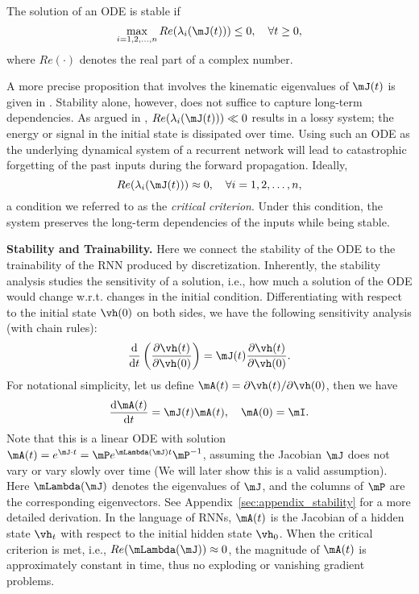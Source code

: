 \begin{proposition}
The solution of an ODE is stable if
\begin{equation}
    \max_{i = 1, 2, \ldots, n}
    Re(\lambda_i(\mJ(t))) 
    \leq
    0,
    \quad 
    \forall t \geq 0,
\end{equation}
where $Re(\cdot)$ denotes the real part of a complex number.
\end{proposition}
A more precise proposition that involves the kinematic eigenvalues of $\mJ(t)$ is given in \cite{ascher1994numerical}.
Stability alone, however, does not suffice to capture long-term dependencies. As argued in \cite{haber2017stable}, $Re(\lambda_i(\mJ(t))) \ll 0$ results in a lossy system;
the energy or signal in the initial state is dissipated over time.
Using such an ODE as the underlying dynamical system of a recurrent network will lead to catastrophic forgetting of the past inputs during the forward propagation.  
Ideally, 
\begin{equation}
    \label{eq:ODE_zero_re_cond}
    Re(\lambda_i(\mJ(t))) \approx 0, 
    \quad 
    \forall i=1, 2, \ldots, n,
\end{equation}
a condition we referred to as the \textit{critical criterion}.
Under this condition, the system preserves the long-term dependencies of the inputs while being stable. 

\textbf{Stability and Trainability.} Here we connect the stability of the ODE to the trainability of the RNN produced by discretization. 
Inherently, the stability analysis studies the sensitivity of a solution, i.e., how much a solution of the ODE would change w.r.t. changes in the initial condition. 
Differentiating  with respect to the initial state $\vh(0)$ on both sides, we have the following sensitivity analysis (with chain rules):
\begin{equation}
    \frac
    {\mathrm{d}}
    {\mathrm{d} t}
    \left(
    \frac
    {\partial \vh(t)}
    {\partial \vh(0)}
    \right)
    =
    \mJ(t)
    \frac
    {\partial \vh(t)}
    {\partial \vh(0)}
    .
\end{equation}
For notational simplicity, let us define $\mA(t) = {\partial \vh(t)} / {\partial \vh(0)}$, then we have
\begin{equation}
    \frac
    {\mathrm{d} \mA(t)}
    {\mathrm{d} t}
    = 
    \mJ(t)\mA(t),
    \quad
    \mA(0) = \mI.
\end{equation}
Note that this is a linear ODE with solution $\mA(t) = e^{\mJ \cdot t} = \mP e^{\mLambda(\mJ)t} \mP^{-1}$, assuming the Jacobian $\mJ$ does not vary or vary slowly over time (We will later show this is a valid assumption). Here $\mLambda(\mJ)$ denotes the eigenvalues of $\mJ$, and the columns of $\mP$ are the corresponding eigenvectors. See Appendix~\ref{sec:appendix_stability} for a more detailed derivation.
In the language of RNNs, $\mA(t)$ is 
the Jacobian of a hidden state $\vh_t$ with respect to the initial hidden state $\vh_0$.
When the critical criterion is met, i.e., $Re(\mLambda(\mJ)) \approx 0$, the magnitude of $\mA(t)$ is approximately constant in time, thus no exploding or vanishing gradient problems.



